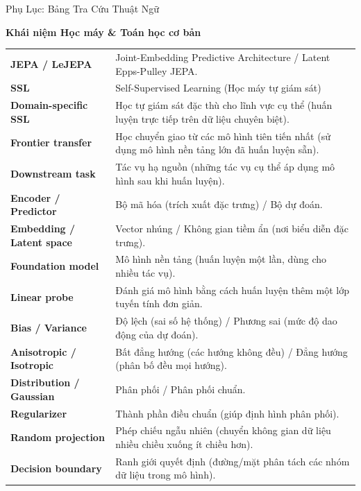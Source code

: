 \documentclass[aspectratio=169,9pt]{beamer}
\begin{document}
\begin{frame}[allowframebreaks]{Phụ Lục: Bảng Tra Cứu Thuật Ngữ}
  \begin{primarybox}
  \footnotesize \textbf{Khái niệm Học máy \& Toán học cơ bản}
  \end{primarybox}
  \vspace{0.5em}
  {\scriptsize
  \renewcommand{\arraystretch}{1.4}
  \begin{tabular}{@{} >{\bfseries\color{mprimary}}l p{10.5cm} @{}}
    JEPA / LeJEPA & Joint-Embedding Predictive Architecture / Latent Epps-Pulley JEPA. \\
    SSL & Self-Supervised Learning (Học máy tự giám sát)\\
    Domain-specific SSL & Học tự giám sát đặc thù cho lĩnh vực cụ thể (huấn luyện trực tiếp trên dữ liệu chuyên biệt). \\
    Frontier transfer & Học chuyển giao từ các mô hình tiên tiến nhất (sử dụng mô hình nền tảng lớn đã huấn luyện sẵn). \\
    Downstream task & Tác vụ hạ nguồn (những tác vụ cụ thể áp dụng mô hình sau khi huấn luyện). \\
    Encoder / Predictor & Bộ mã hóa (trích xuất đặc trưng) / Bộ dự đoán. \\
    Embedding / Latent space & Vector nhúng / Không gian tiềm ẩn (nơi biểu diễn đặc trưng). \\
    Foundation model & Mô hình nền tảng (huấn luyện một lần, dùng cho nhiều tác vụ). \\
    Linear probe & Đánh giá mô hình bằng cách huấn luyện thêm một lớp tuyến tính đơn giản. \\
    Bias / Variance & Độ lệch (sai số hệ thống) / Phương sai (mức độ dao động của dự đoán). \\
    Anisotropic / Isotropic & Bất đẳng hướng (các hướng không đều) / Đẳng hướng (phân bố đều mọi hướng). \\
    Distribution / Gaussian & Phân phối / Phân phối chuẩn. \\
    Regularizer & Thành phần điều chuẩn (giúp định hình phân phối). \\
    Random projection & Phép chiếu ngẫu nhiên (chuyển không gian dữ liệu nhiều chiều xuống ít chiều hơn). \\
    Decision boundary & Ranh giới quyết định (đường/mặt phân tách các nhóm dữ liệu trong mô hình). \\
  \end{tabular}
  }

  \framebreak


\end{frame}
\end{document}
